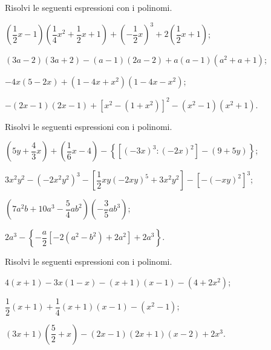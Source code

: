 \begin{esercizio}
\label{ese:11.46} %
Risolvi le seguenti espressioni con i polinomi.
 \begin{enumeratea}
 \item $\left(\dfrac{1}{2}x-1\right)\left(\dfrac{1}{4}x^{2}+\dfrac{1}{2}x+1\right)+\left(-{\dfrac{1}{2}}x\right)^{3}+2\left(\dfrac{1}{2}x+1\right)$;
 \item $(3a-2)(3a+2)-(a-1)(2a-2)+a(a-1)\left(a^{2}+a+1\right)$;
 \item $-4x(5-2x)+\left(1-4x+x^{2}\right)\left(1-4x-x^{2}\right)$;
 \item $-(2x-1)(2x-1)+\left[x^{2}-\left(1+x^{2}\right)\right]^{2}-\left(x^{2}-1\right)\left(x^{2}+1\right)$.
 \end{enumeratea}
\end{esercizio}

\begin{esercizio}[\Ast]
\label{ese:11.47}
Risolvi le seguenti espressioni con i polinomi.
 \begin{enumeratea}
 \item $\left(5y+\dfrac{4}{3}x\right)+\left(\dfrac{1}{6}x-4\right)-\left\lbrace\left[(-3x)^3:(-2x)^2\right]-(9+5y)\right\rbrace$;
 \item $3x^{2}y^{2}-\left(-2x^{2}y^{2}\right)^{3}-\left[\dfrac{1}{2}xy(-2xy)^{5}+3x^{2}y^{2}\right]-\left[-(-xy)^{2}\right]^{3}$;
 \item $\left(7a^{2}b+10a^{3}-\dfrac{5}{4}ab^{2}\right)\left(-\dfrac{3}{5}ab^{3}\right)$;
 \item $2a^{3}-\left\lbrace-\dfrac{a}{2}\left[-2\left(a^{2}-b^{2}\right)+2a^{2}\right]+2a^{3}\right\rbrace$.
 \end{enumeratea}
\end{esercizio}

\begin{esercizio}
\label{ese:11.48}
Risolvi le seguenti espressioni con i polinomi.
 \begin{enumeratea}
 \item $4(x+1)-3x(1-x)-(x+1)(x-1)-\left(4+2x^{2}\right)$;
 \item $\dfrac{1}{2}(x+1)+\dfrac{1}{4}(x+1)(x-1)-\left(x^{2}-1\right)$;
 \item $(3x+1)\left(\dfrac{5}{2}+x\right)-(2x-1)(2x+1)(x-2)+2x^{3}$.
 \end{enumeratea}
\end{esercizio}

